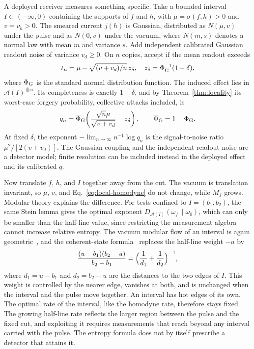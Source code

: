 \documentclass[11pt,a4paper]{article}
\newcommand{\A}{\mathcal{A}}
\begin{document}
A deployed receiver measures something specific. Take a bounded interval $I\subset(-\infty,0)$ containing the supports of $f$ and $h$, with $\mu=\sigma(f,h)>0$ and $v=v_h>0$. The smeared current $j(h)$ is Gaussian, distributed as $N(\mu,v)$ under the pulse and as $N(0,v)$ under the vacuum, where $N(m,s)$ denotes a normal law with mean $m$ and variance $s$. Add independent calibrated Gaussian readout noise of variance $v_d\ge0$. On $n$ copies, accept if the mean readout exceeds
\begin{equation}
t_n=\mu-\sqrt{(v+v_d)/n}\,z_\delta,\quad
z_\delta=\Phi_{\rm G}^{-1}(1-\delta),
\end{equation}
where $\Phi_{\rm G}$ is the standard normal distribution function. The induced effect lies in $\A(I)^{\bar\otimes n}$. Its completeness is exactly $1-\delta$, and by Theorem~\ref{thm:locality} its worst-case forgery probability, collective attacks included, is
\begin{equation}
q_n=\overline\Phi_{\rm G}\!\left(\frac{\sqrt n\mu}{\sqrt{v+v_d}}-z_\delta\right),
\qquad \overline\Phi_{\rm G}=1-\Phi_{\rm G}.
\label{eq:local-homodyne}
\end{equation}
At fixed $\delta$, the exponent $-\lim_{n\to\infty}n^{-1}\log q_n$ is the signal-to-noise ratio $\mu^2/[2(v+v_d)]$. The Gaussian coupling and the independent readout noise are a detector model; finite resolution can be included instead in the deployed effect and its calibrated $q$.

Now translate $f$, $h$, and $I$ together away from the cut. The vacuum is translation invariant, so $\mu$, $v$, and Eq.~\eqref{eq:local-homodyne} do not change, while $M_f$ grows. Modular theory explains the difference. For tests confined to $I=(b_1,b_2)$, the same Stein lemma gives the optimal exponent $D_{\A(I)}(\omega_f\|\omega_0)$, which can only be smaller than the half-line value, since restricting the measurement algebra cannot increase relative entropy. The vacuum modular flow of an interval is again geometric~\cite{hislop1982modular}, and the coherent-state formula~\cite{garbarz2023interval} replaces the half-line weight $-u$ by
\begin{equation*}
\frac{(u-b_1)(b_2-u)}{b_2-b_1}=\Bigl(\frac1{d_1}+\frac1{d_2}\Bigr)^{-1},
\end{equation*}
where $d_1=u-b_1$ and $d_2=b_2-u$ are the distances to the two edges of $I$. This weight is controlled by the nearer edge, vanishes at both, and is unchanged when the interval and the pulse move together. An interval has hot edges of its own. The optimal rate of the interval, like the homodyne rate, therefore stays fixed. The growing half-line rate reflects the larger region between the pulse and the fixed cut, and exploiting it requires measurements that reach beyond any interval carried with the pulse. The entropy formula does not by itself prescribe a detector that attains it.
\end{document}
